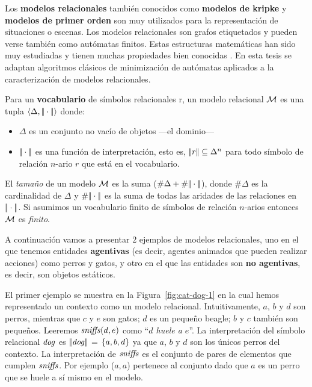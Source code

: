 Los \textbf{modelos relacionales} tambi\'en conocidos como \textbf{modelos de kripke} y \textbf{modelos de primer orden} son muy utilizados para la representaci\'on de situaciones o escenas. 
Los modelos relacionales son grafos etiquetados y pueden verse tambi\'en como aut\'omatas finitos. Estas estructuras matem\'aticas han sido muy estudiadas y tienen muchas propiedades bien conocidas \cite{arec:hybr05b}. En esta tesis se adaptan algoritmos cl\'asicos de minimizaci\'on de aut\'omatas aplicados a la caracterizaci\'on de modelos relacionales.

Para un \textbf{vocabulario} de s\'imbolos relacionales r, un modelo relacional $\mathcal{M}$ es una tupla $\langle \Delta,|\!|\cdot|\!| \rangle$ donde:
\begin{itemize}
 \item $\Delta$ es un conjunto no vac\'io de objetos ---el dominio---
 \item $|\!|\cdot|\!|$ es una funci\'on de interpretaci\'on, esto es, $|\!|r|\!| \subseteq \Delta^n$ para todo s\'imbolo de relaci\'on $n$-ario $r$ que est\'a en el vocabulario.  
\end{itemize}
El \emph{tama\~no} de un modelo $\mathcal{M}$ es la suma ($\#\Delta + \#|\!|\cdot|\!|$), donde $\#\Delta$ es la cardinalidad
de $\Delta$ y $\#|\!|\cdot|\!|$ es la suma de todas las aridades de las relaciones en $|\!|\cdot|\!|$.
Si asumimos un vocabulario finito de s\'imbolos de relaci\'on $n$-arios entonces $\mathcal{M}$ es \emph{finito}. 



A continuaci\'on vamos a presentar 2 ejemplos de modelos relacionales, uno en el que tenemos entidades \textbf{agentivas} (es decir, agentes animados que pueden realizar acciones) como perros y gatos, y otro en el que las entidades son \textbf{no agentivas}, es decir, son objetos est\'aticos.

El primer ejemplo se muestra en la Figura~\ref{fig:cat-dog-1} en la cual hemos representado un contexto
como un modelo relacional. Intuitivamente, $a$, $b$ y $d$ son perros, mientras que 
$c$ y $e$ son gatos;  $d$ es un peque\~no beagle; $b$ y $c$ tambi\'en son peque\~nos.
 Leeremos $\mathit{sniffs}(d,e)$ como ``{\em $d$ huele a $e$}''. La interpretaci\'on del s\'imbolo relacional $\mathit{dog}$ es $|\!|\mathit{dog}|\!|$  =  $\{a,b,d\}$ ya que $a$, $b$ y $d$ son los \'unicos perros del contexto. La interpretaci\'on de $\mathit{sniffs}$ es el conjunto de pares de elementos que cumplen $\mathit{sniffs}$. Por ejemplo ($a,a$) pertenece al conjunto dado que $a$ es un perro que se huele a s\'i mismo en el modelo.

